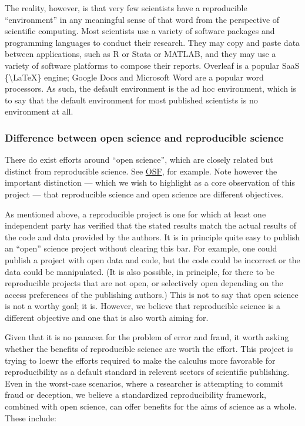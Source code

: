 The reality, however, is that very few scientists have a reproducible ``environment'' in any meaningful sense of that word from the perspective of scientific computing. Most scientists use a variety of software packages and programming languages to conduct their research. They may copy and paste data between applications, such as R or Stata or MATLAB, and they may use a variety of software platforms to compose their reports. Overleaf is a popular SaaS \{\textbackslash{}LaTeX\}   engine; Google Docs and Microsoft Word are a popular word processors. As such, the default environment is the ad hoc environment, which is to say that the default environment for most published scientists is no environment at all.

\hypertarget{difference-between-open-science-and-reproducible-science}{%
\subsubsection{Difference between open science and reproducible science}\label{difference-between-open-science-and-reproducible-science}}

There do exist efforts around ``open science'', which are closely related but distinct from reproducible science. See \href{https://osf.io/tvyxz/}{OSF}, for example. Note however the important distinction --- which we wish to highlight as a core observation of this project --- that reproducible science and open science are different objectives.

As mentioned above, a reproducible project is one for which at least one independent party has verified that the stated results match the actual results of the code and data provided by the authors. It is in principle quite easy to publish an ``open'' science project without clearing this bar. For example, one could publish a project with open data and code, but the code could be incorrect or the data could be manipulated. (It is also possible, in principle, for there to be reproducible projects that are not open, or selectively open depending on the access preferences of the publishing authors.)
This is not to say that open science is not a worthy goal; it is. However, we believe that reproducible science is a different objective and one that is also worth aiming for.

Given that it is no panacea for the problem of error and fraud, it worth asking whether the benefits of reproducible science are worth the effort. This project is trying to loewr the efforts required to make the calculus more favorable for reproducibility as a default standard in relevent sectors of scientific publishing. 
Even in the worst-case scenarios, where a researcher is attempting to commit fraud or deception, we believe a standardized reproducibility framework, combined with open science, can offer benefits for the aims of science as a whole. These include:

